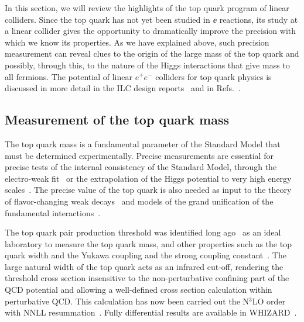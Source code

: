 



In this section, we will review the  highlights of the top quark
program of linear colliders.     Since the top quark has not yet been
studied in $\ee$  reactions,  its study at a linear collider gives the
opportunity to dramatically improve the precision with which we know
its properties.   As we have explained above, such precision
measurement can reveal clues to the origin of the large mass of the
top quark and possibly, through this, to the nature of the Higgs
interactions that give mass to all fermions.
The potential of linear $e^+e^-$ colliders for top quark physics is
discussed in more detail in the 
ILC design reports~\cite{Baer:2013cma,Behnke:2013lya}
and in Refs.~\cite{Agashe:2013hma,Vos:2016til,Abramowicz:2018rjq}.




\subsection{Measurement of the top quark mass}
\label{subsec:top:topmass}

The top quark mass is a fundamental parameter of the Standard Model that must be
determined experimentally. Precise measurements are essential for precise tests of
the internal consistency of the Standard Model, through the electro-weak
fit~\cite{Baak:2014ora} or the extrapolation of the Higgs potential to
very high energy
scales~\cite{Degrassi:2012ry}.   The precise value of the top quark is
also needed as input to the theory of flavor-changing weak
decays~\cite{Buras:2009if} and models of the grand unification of the
fundamental interactions~\cite{Langacker:1994vf}.

The top quark pair production threshold was identified long ago~\cite{Gusken:1985nf} as
an ideal laboratory to measure the top quark mass, and other properties such as the top quark
width and the Yukawa coupling and the strong coupling constant~\cite{Strassler:1990nw}.
The large natural width of the top quark acts as an infrared cut-off,
rendering the threshold cross section insensitive to the non-perturbative confining part
of the QCD potential and allowing a well-defined  cross section
calculation within  perturbative QCD.  This calculation has now been
carried out the N$^3$LO order~\cite{Beneke:2015kwa} with  NNLL resummation~\cite{Hoang:2013uda}. Fully differential results are available in WHIZARD~\cite{Bach:2017ggt}.

